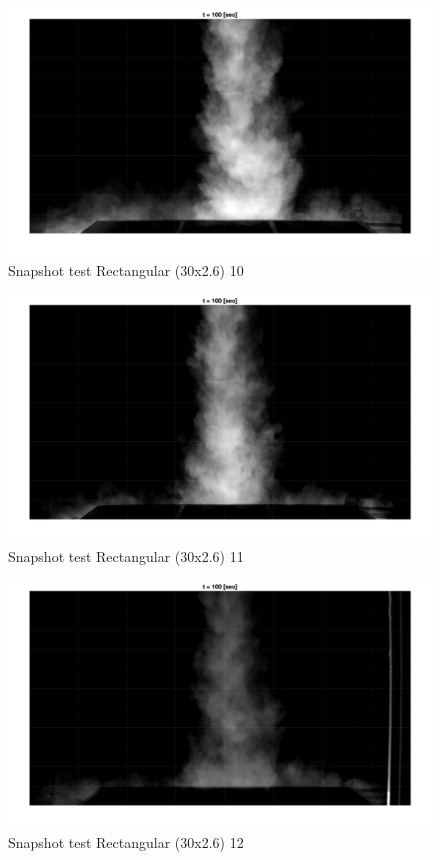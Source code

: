 \begin{figure}[ht!]
    \centering
    \includegraphics[width=\linewidth]{Images/Rec30_10_t100.jpg}
    \caption{Snapshot test Rectangular (30x2.6) 10}
\end{figure}

\begin{figure}[ht!]
    \centering
    \includegraphics[width=\linewidth]{Images/Rec30_11_t100.jpg}
    \caption{Snapshot test Rectangular (30x2.6) 11}
\end{figure}

\begin{figure}[ht!]
    \centering
    \includegraphics[width=\linewidth]{Images/Rec30_12_t100.jpg}
    \caption{Snapshot test Rectangular (30x2.6) 12}
\end{figure}

